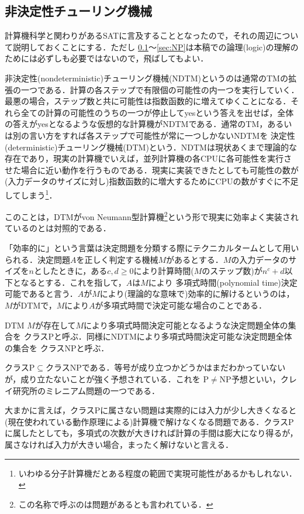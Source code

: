 \documentclass{ltjsarticle}
\theoremstyle{mystyle1}
\theoremstyle{mystyle3}
\theoremstyle{mystyle2}
\newcommand{\red}[1]{{\color{red} #1}}
\begin{document}
\subsection{非決定性チューリング機械}\label{sec:NDTM}
計算機科学と関わりがあるSATに言及することとなったので，それの周辺について説明しておくことにする．ただし \ref{sec:NDTM}～\ref{sec:NP}は本稿での論理(logic)の理解のためには必ずしも必要ではないので，飛ばしてもよい．

\red{非決定性}(nondeterministic)チューリング機械(NDTM)というのは通常のTMの拡張の一つである．計算の各ステップで有限個の可能性の内一つを実行していく．最悪の場合，ステップ数と共に可能性は指数函数的に増えてゆくことになる．それら全ての計算の可能性のうちの一つが停止してyesという答えを出せば，全体の答えがyesとなるような仮想的な計算機がNDTMである．通常のTM，あるいは別の言い方をすれば各ステップで可能性が常に一つしかないNDTMを\red{決定性}(deterministic)チューリング機械(DTM)という．NDTMは現状あくまで理論的な存在であり，現実の計算機でいえば，並列計算機の各CPUに各可能性を実行させた場合に近い動作を行うものである．現実に実装できたとしても可能性の数が(入力データのサイズに対し)指数函数的に増大するためにCPUの数がすぐに不足してしまう\footnote{いわゆる分子計算機だとある程度の範囲で実現可能性があるかもしれない．}．

このことは，DTMがvon Neumann型計算機\footnote{この名称で呼ぶのは問題があるとも言われている．}という形で現実に効率よく実装されているのとは対照的である．

「効率的に」という言葉は決定問題を分類する際にテクニカルタームとして用いられる．決定問題$A$を正しく判定する機械$M$があるとする．$M$の入力データのサイズを$n$としたときに，ある$c,d\geq 0$により計算時間($M$のステップ数)が$n^c + d$以下となるとする．これを指して，$A$は$M$により\red{多項式時間}(polynomial time)決定可能であると言う．$A$が$M$により(理論的な意味で)効率的に解けるというのは，$M$がDTMで，$M$により$A$が多項式時間で決定可能な場合のことである．

DTM $M$が存在して$M$により多項式時間決定可能となるような決定問題全体の集合を\red{クラスP}と呼ぶ．同様にNDTMにより多項式時間決定可能な決定問題全体の集合を\red{クラスNP}と呼ぶ．

クラスP$\subseteq$クラスNPである．等号が成り立つかどうかはまだわかっていないが，成り立たないことが強く予想されている．これを\red{P$\neq$NP予想}といい，クレイ研究所のミレニアム問題の一つである．

大まかに言えば，クラスPに属さない問題は実際的には入力が少し大きくなると(現在使われている動作原理による)計算機で解けなくなる問題である．クラスPに属したとしても，多項式の次数が大きければ計算の手間は膨大になり得るが，属さなければ入力が大きい場合，まったく解けないと言える．
\end{document}
